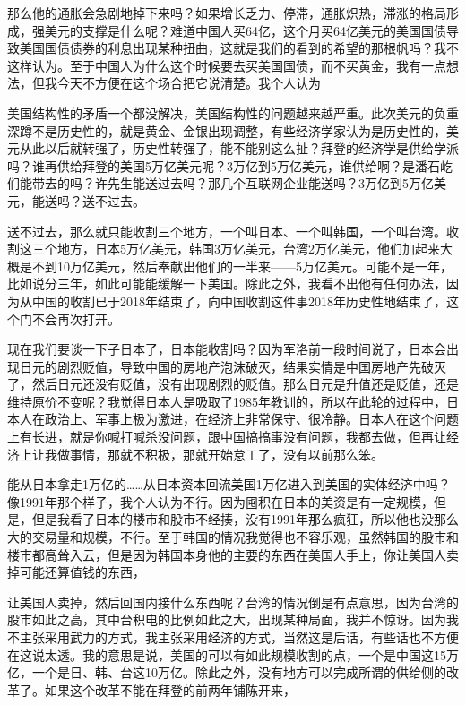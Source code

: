 \documentclass[UTF8, 12pt, a4paper]{ctexrep}
\begin{document}
那么他的通胀会急剧地掉下来吗？如果增长乏力、停滞，通胀炽热，滞涨的格局形成，强美元的支撑是什么呢？难道中国人买64亿，这个月买64亿美元的美国国债导致美国国债债券的利息出现某种扭曲，这就是我们的看到的希望的那根帆吗？我不这样认为。至于中国人为什么这个时候要去买美国国债，而不买黄金，我有一点想法，但我今天不方便在这个场合把它说清楚。我个人认为

美国结构性的矛盾一个都没解决，美国结构性的问题越来越严重。此次美元的负重深蹲不是历史性的，就是黄金、金银出现调整，有些经济学家认为是历史性的，美元从此以后就转强了，历史性转强了，能不能别这么扯？拜登的经济学是供给学派吗？谁再供给拜登的美国5万亿美元呢？3万亿到5万亿美元，谁供给啊？是潘石屹们能带去的吗？许先生能送过去吗？那几个互联网企业能送吗？3万亿到5万亿美元，能送吗？送不过去。

送不过去，那么就只能收割三个地方，一个叫日本、一个叫韩国，一个叫台湾。收割这三个地方，日本5万亿美元，韩国3万亿美元，台湾2万亿美元，他们加起来大概是不到10万亿美元，然后奉献出他们的一半来——5万亿美元。可能不是一年，比如说分三年，如此可能能缓解一下美国。除此之外，我看不出他有任何办法，因为从中国的收割已于2018年结束了，向中国收割这件事2018年历史性地结束了，这个门不会再次打开。

现在我们要谈一下子日本了，日本能收割吗？因为军洛前一段时间说了，日本会出现日元的剧烈贬值，导致中国的房地产泡沫破灭，结果实情是中国房地产先破灭了，然后日元还没有贬值，没有出现剧烈的贬值。那么日元是升值还是贬值，还是维持原价不变呢？我觉得日本人是吸取了1985年教训的，所以在此轮的过程中，日本人在政治上、军事上极为激进，在经济上非常保守、很冷静。日本人在这个问题上有长进，就是你喊打喊杀没问题，跟中国搞搞事没有问题，我都去做，但再让经济上让我做事情，那就不积极，那就开始怠工了，没有以前那么笨。

能从日本拿走1万亿的……从日本资本回流美国1万亿进入到美国的实体经济中吗？像1991年那个样子，我个人认为不行。因为囤积在日本的美资是有一定规模，但是，但是我看了日本的楼市和股市不经揍，没有1991年那么疯狂，所以他也没那么大的交易量和规模，不行。至于韩国的情况我觉得也不容乐观，虽然韩国的股市和楼市都高耸入云，但是因为韩国本身他的主要的东西在美国人手上，你让美国人卖掉可能还算值钱的东西，

让美国人卖掉，然后回国内接什么东西呢？台湾的情况倒是有点意思，因为台湾的股市如此之高，其中台积电的比例如此之大，出现某种局面，我并不惊讶。因为我不主张采用武力的方式，我主张采用经济的方式，当然这是后话，有些话也不方便在这说太透。我的意思是说，美国的可以有如此规模收割的点，一个是中国这15万亿，一个是日、韩、台这10万亿。除此之外，没有地方可以完成所谓的供给侧的改革了。如果这个改革不能在拜登的前两年铺陈开来，
\end{document}
